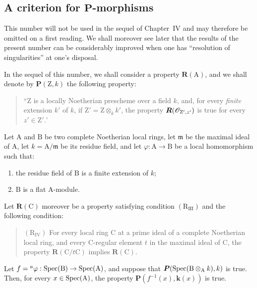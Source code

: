 \subsection{A criterion for \texorpdfstring{$\boldsymbol{P}$}{P}-morphisms}
\label{subsection:IV.7.5}

\begin{env}[7.5.0]
\label{IV.7.5.0}
This number will not be used in the sequel of Chapter~IV and may therefore be omitted on a first reading. We shall moreover see later  that the results of the present number can be considerably improved when one has ``resolution of singularities'' at one's disposal.

In the sequel of this number, we shall consider a property $\boldsymbol{R}(\mathrm{A})$, and we shall denote by $\boldsymbol{P}(\mathrm{Z},k)$ the following property:
\begin{quote}
``$\mathrm{Z}$ is a locally Noetherian prescheme over a field $k$, and, for every \emph{finite} extension $k'$ of $k$, if $\mathrm{Z}'=\mathrm{Z}\otimes_k k'$, the property $\boldsymbol{R}(\mathscr{O}_{\mathrm{Z}',z'})$ is true for every $z'\in\mathrm{Z}'.$'
\end{quote}
\end{env}

\begin{theorem}[7.5.1]
\label{IV.7.5.1}
Let $\mathrm{A}$ and $\mathrm{B}$ be two \textup{complete} Noetherian local rings, let $\mathfrak{m}$ be the maximal ideal of $\mathrm{A}$, let $k=\mathrm{A}/\mathfrak{m}$ be its residue field, and let $\varphi:\mathrm{A}\to\mathrm{B}$ be a local homomorphism such that:
\begin{enumerate}[label=(\roman*)]
  \item the residue field of $\mathrm{B}$ is a finite extension of $k$;
  \item $\mathrm{B}$ is a flat $\mathrm{A}$-module.
\end{enumerate}
Let $\boldsymbol{R}(\mathrm{C})$ moreover be a property satisfying condition $(\mathrm{R}_{\mathrm{III}})$  and the following condition:
\begin{quote}
$(\mathrm{R}_{\mathrm{IV}})$ For every local ring $\mathrm{C}$ at a prime ideal of a complete Noetherian local ring, and every $\mathrm{C}$-regular element $t$ in the maximal ideal of $\mathrm{C}$, the property $\boldsymbol{R}(\mathrm{C}/t\mathrm{C})$ implies $\boldsymbol{R}(\mathrm{C})$.
\end{quote}


Let $f={}^a\varphi:\operatorname{Spec}(\mathrm{B})\to\operatorname{Spec}(\mathrm{A})$, and suppose that $\boldsymbol{P}(\operatorname{Spec}(\mathrm{B}\otimes_\mathrm{A}k),k)$ is true. Then, for every $x\in\operatorname{Spec}(\mathrm{A})$, the property $\boldsymbol{P}(f^{-1}(x),\boldsymbol{k}(x))$ is true.
\end{theorem}

